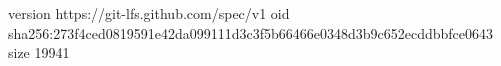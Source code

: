 version https://git-lfs.github.com/spec/v1
oid sha256:273f4ced0819591e42da099111d3c3f5b66466e0348d3b9c652ecddbbfce0643
size 19941
